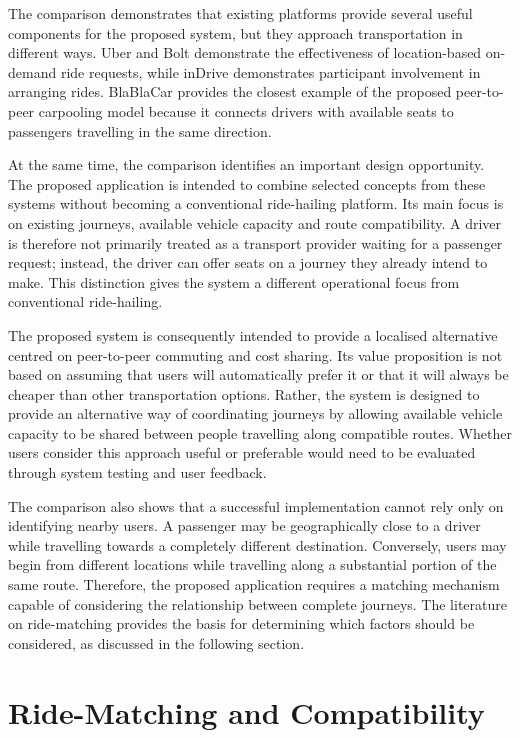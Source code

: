 The comparison demonstrates that existing platforms provide several useful components for the proposed system, but they approach transportation in different ways. Uber and Bolt demonstrate the effectiveness of location-based on-demand ride requests, while inDrive demonstrates participant involvement in arranging rides. BlaBlaCar provides the closest example of the proposed peer-to-peer carpooling model because it connects drivers with available seats to passengers travelling in the same direction.

At the same time, the comparison identifies an important design opportunity. The proposed application is intended to combine selected concepts from these systems without becoming a conventional ride-hailing platform. Its main focus is on existing journeys, available vehicle capacity and route compatibility. A driver is therefore not primarily treated as a transport provider waiting for a passenger request; instead, the driver can offer seats on a journey they already intend to make. This distinction gives the system a different operational focus from conventional ride-hailing.

The proposed system is consequently intended to provide a localised alternative centred on peer-to-peer commuting and cost sharing. Its value proposition is not based on assuming that users will automatically prefer it or that it will always be cheaper than other transportation options. Rather, the system is designed to provide an alternative way of coordinating journeys by allowing available vehicle capacity to be shared between people travelling along compatible routes. Whether users consider this approach useful or preferable would need to be evaluated through system testing and user feedback.

The comparison also shows that a successful implementation cannot rely only on identifying nearby users. A passenger may be geographically close to a driver while travelling towards a completely different destination. Conversely, users may begin from different locations while travelling along a substantial portion of the same route. Therefore, the proposed application requires a matching mechanism capable of considering the relationship between complete journeys. The literature on ride-matching provides the basis for determining which factors should be considered, as discussed in the following section.

\section{Ride-Matching and Compatibility}
\label{sec:matching}

